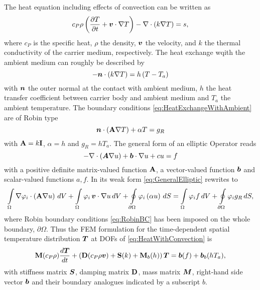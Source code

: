 \documentclass[]{elsarticle}
\begin{document}
The heat equation including effects of convection can be written as
\begin{equation}
\label{eq:HeatWithConvection}
c_{P}\rho\left(\frac{\partial T}{\partial t}+\boldsymbol{v}\cdot \nabla T\right)-\nabla\cdot\left(k\nabla T\right)=s,
\end{equation}
where $c_{P}$ is the specific heat, $\rho$ the density, $\boldsymbol{v}$ the velocity, and $k$ the thermal conductivity of the carrier medium, respectively. The heat exchange wqith the ambient medium can roughly be described by
\begin{equation}
\label{eq:HeatExchangeWithAmbient}
-\boldsymbol{n}\cdot\left(k\nabla T\right)=h\left(T-T_{a}\right)
\end{equation}
with $\boldsymbol{n}$ the outer normal at the contact with ambient medium, $h$ the heat transfer coefficient between carrier body and ambient medium and $T_{a}$ the ambient temperature. The boundary conditions \eqref{eq:HeatExchangeWithAmbient} are of Robin type
\begin{equation}
\label{eq:RobinBC}
	\boldsymbol{n}\cdot\left(\mathbf{A}\nabla T\right)+\alpha T=g_{R}
\end{equation}
with $\mathbf{A}=k\mathbf{I}$, $\alpha=h$ and $g_{R}=hT_{a}$. The general form of an elliptic Operator reads
\begin{equation}
\label{eq:GeneralElliptic}
	-\nabla\cdot\left(\boldsymbol{A}\nabla u\right)+\boldsymbol{b}\cdot \nabla u+cu=f
\end{equation}
with a positive definite matrix-valued function $\mathbf{A}$, a vector-valued function $\boldsymbol{b}$ and scalar-valued functions $a,f$. In its weak form 
\eqref{eq:GeneralElliptic} rewrites to
\begin{equation}
\label{eq:GeneralEllipticWeak}
\int\limits_{\Omega} \nabla \varphi_{i}\cdot\left(\mathbf{A}\nabla u\right)\,dV +\int\limits_{\Omega}\varphi_{i}\,\boldsymbol{v}\cdot\nabla u\, dV+\oint\limits_{\partial \Omega}\varphi_{i}\left(\alpha u\right)\, dS = \int\limits_{\Omega}\varphi_{i} f\, dV + \oint\limits_{\partial \Omega} \varphi_{i} g_{R} \, dS,
\end{equation}
where Robin boundary conditions \eqref{eq:RobinBC} has been imposed on the whole boundary, $\partial\Omega$. Thus the FEM formulation for the time-dependent spatial temperature distribution $\boldsymbol{T}$ at DOFs of \eqref{eq:HeatWithConvection} is
\begin{equation}
\label{eq:HeatWithConvectionFEM}
\mathbf{M}(c_{P}\rho)\frac{d \boldsymbol{T}}{dt}+\left(\mathbf{D}(c_{P}\rho \boldsymbol{v})+\mathbf{S}(k) + \mathbf{M}_{b}(h)\right)\boldsymbol{T} = \boldsymbol{b}(f)+\boldsymbol{b}_{b}(hT_{a}),
\end{equation}
with stiffness matrix $\boldsymbol{S}$, damping matrix $\mathbf{D}$, mass matrix $\boldsymbol{M}$, right-hand side vector $\boldsymbol{b}$ and their boundary analogues indicated by a subscript $b$.

%
%
%
%
%
%
%
%
%
%
%
%
%
%
%
%
\end{document}
